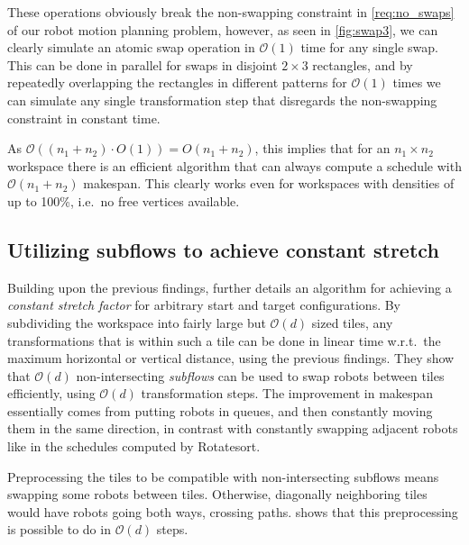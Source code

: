 These operations obviously break the non-swapping constraint in \cref{req:no_swaps} of our robot motion planning problem, however, as seen in \cref{fig:swap3}, we can clearly simulate an atomic swap operation in \(\mathcal{O}(1)\) time for any single swap.
This can be done in parallel for swaps in disjoint \(2 \times 3\) rectangles, and by repeatedly overlapping the rectangles in different patterns for \(\mathcal{O}(1)\) times we can simulate any single transformation step that disregards the non-swapping constraint in constant time.

As \(\mathcal{O}((n_1 + n_2) \cdot O(1)) = O(n_1 + n_2)\), this implies that for an \(n_1 \times n_2\) workspace there is an efficient algorithm that can always compute a schedule with \(\mathcal{O}(n_1 + n_2)\) makespan. 
This clearly works even for workspaces with densities of up to 100\%, i.e.~no free vertices available.


\subsection{Utilizing subflows to achieve constant stretch}

Building upon the previous findings, \cite{siamcomp/DemaineFKMS19} further details an algorithm for achieving a \emph{constant stretch factor} for arbitrary start and target configurations.
By subdividing the workspace into fairly large but \(\mathcal{O}(d)\) sized tiles, any transformations that is within such a tile can be done in linear time w.r.t.~the maximum horizontal or vertical distance, using the previous findings.
They show that \(\mathcal{O}(d)\) non-intersecting \emph{subflows} can be used to swap robots between tiles efficiently, using \(\mathcal{O}(d)\) transformation steps.
The improvement in makespan essentially comes from putting robots in queues, and then constantly moving them in the same direction, in contrast with constantly swapping adjacent robots like in the schedules computed by Rotatesort.

Preprocessing the tiles to be compatible with non-intersecting subflows means swapping some robots between tiles. 
Otherwise, diagonally neighboring tiles would have robots going both ways, crossing paths. 
\cite{siamcomp/DemaineFKMS19} shows that this preprocessing is possible to do in \(\mathcal{O}(d)\) steps. 

